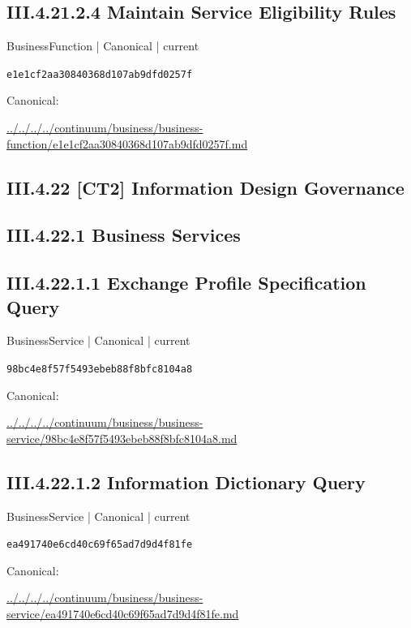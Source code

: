 \documentclass[10pt,a4paper]{article}
\begin{document}
\subsection*{III.4.21.2.4 Maintain Service Eligibility Rules}
{\small BusinessFunction | Canonical | current}\par
\texttt{e1e1cf2aa30840368d107ab9dfd0257f}\par
Canonical: \par
{\footnotesize\url{../../../../continuum/business/business-function/e1e1cf2aa30840368d107ab9dfd0257f.md}}\par
\subsection*{III.4.22 [CT2] Information Design Governance}
\subsection*{III.4.22.1 Business Services}
\subsection*{III.4.22.1.1 Exchange Profile Specification Query}
{\small BusinessService | Canonical | current}\par
\texttt{98bc4e8f57f5493ebeb88f8bfc8104a8}\par
Canonical: \par
{\footnotesize\url{../../../../continuum/business/business-service/98bc4e8f57f5493ebeb88f8bfc8104a8.md}}\par
\subsection*{III.4.22.1.2 Information Dictionary Query}
{\small BusinessService | Canonical | current}\par
\texttt{ea491740e6cd40c69f65ad7d9d4f81fe}\par
Canonical: \par
{\footnotesize\url{../../../../continuum/business/business-service/ea491740e6cd40c69f65ad7d9d4f81fe.md}}\par
\end{document}
